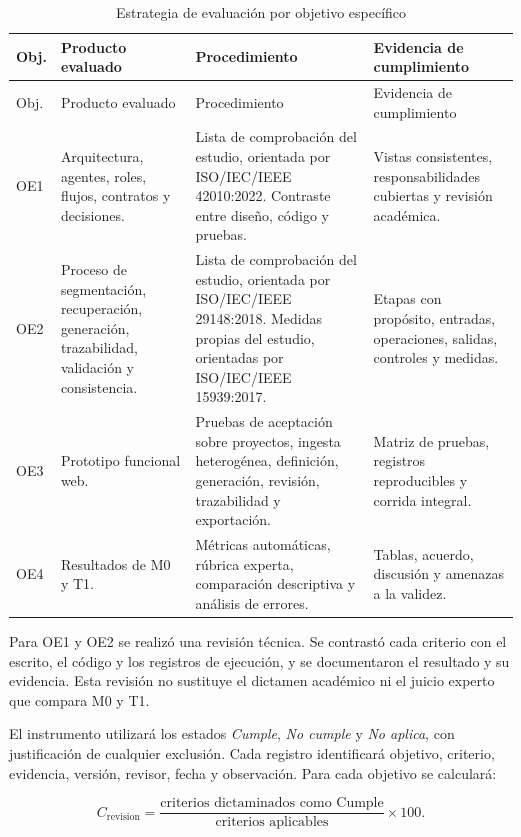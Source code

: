 \begin{longtable}{p{1.0cm}p{4.0cm}p{4.7cm}p{4.2cm}}
  \caption{Estrategia de evaluación por objetivo específico}
  \label{tab:evaluacion-objetivos}\\
  \toprule
  Obj. & Producto evaluado & Procedimiento & Evidencia de cumplimiento \\
  \midrule
  \endfirsthead
  \toprule
  Obj. & Producto evaluado & Procedimiento & Evidencia de cumplimiento \\
  \midrule
  \endhead
  OE1 & Arquitectura, agentes, roles, flujos, contratos y decisiones. & Lista de comprobación del estudio, orientada por ISO/IEC/IEEE 42010:2022. Contraste entre diseño, código y pruebas. & Vistas consistentes, responsabilidades cubiertas y revisión académica. \\
  OE2 & Proceso de segmentación, recuperación, generación, trazabilidad, validación y consistencia. & Lista de comprobación del estudio, orientada por ISO/IEC/IEEE 29148:2018. Medidas propias del estudio, orientadas por ISO/IEC/IEEE 15939:2017. & Etapas con propósito, entradas, operaciones, salidas, controles y medidas. \\
  OE3 & Prototipo funcional web. & Pruebas de aceptación sobre proyectos, ingesta heterogénea, definición, generación, revisión, trazabilidad y exportación. & Matriz de pruebas, registros reproducibles y corrida integral. \\
  OE4 & Resultados de M0 y T1. & Métricas automáticas, rúbrica experta, comparación descriptiva y análisis de errores. & Tablas, acuerdo, discusión y amenazas a la validez. \\
  \bottomrule
\end{longtable}

Para OE1 y OE2 se realizó una revisión técnica. Se contrastó cada criterio con el escrito, el código y los registros de ejecución, y se documentaron el resultado y su evidencia. Esta revisión no sustituye el dictamen académico ni el juicio experto que compara M0 y T1.

El instrumento utilizará los estados \emph{Cumple}, \emph{No cumple} y \emph{No aplica}, con justificación de cualquier exclusión. Cada registro identificará objetivo, criterio, evidencia, versión, revisor, fecha y observación. Para cada objetivo se calculará:

\begin{equation}
  C_{\mathrm{revision}}=
  \frac{\text{criterios dictaminados como Cumple}}
       {\text{criterios aplicables}}\times 100.
\end{equation}

